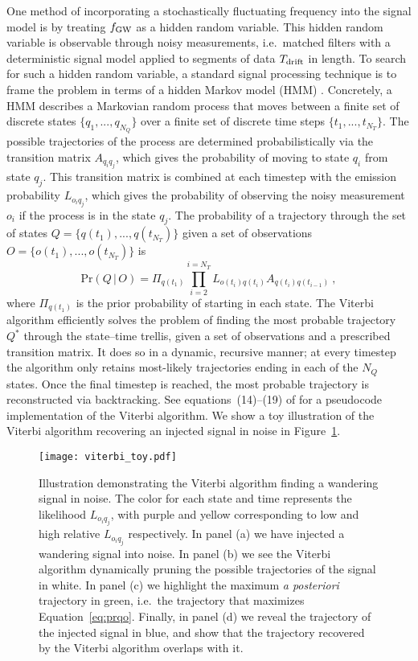 One method of incorporating a stochastically fluctuating frequency into the signal model is by treating $f_{\rm GW}$ as a hidden random variable. This hidden random variable is observable through noisy measurements, i.e.~matched filters with a deterministic signal model applied to segments of data $T_{\rm drift}$ in length. To search for such a hidden random variable, a standard signal processing technique is to frame the problem in terms of a hidden Markov model (HMM) \citep{Baum1966}. Concretely, a HMM describes a Markovian random process that moves between a finite set of discrete states $\{q_1,...,q_{N_Q}\}$ over a finite set of discrete time steps $\{t_1,...,t_{N_T}\}$. The possible trajectories of the process are determined probabilistically via the transition matrix $A_{q_i q_j}$, which gives the probability of moving to state $q_i$ from state $q_j$. This transition matrix is combined at each timestep with the emission probability $L_{o_i q_j}$, which gives the probability of observing the noisy measurement $o_i$ if the process is in the state $q_j$. The probability of a trajectory through the set of states $Q = \{q(t_1),...,q(t_{N_T})\}$ given a set of observations $O = \{o(t_1),...,o(t_{N_T})\}$ is
\begin{equation}
    \textrm{Pr}(Q\,|\,O) = \Pi_{q(t_1)} \prod_{i=2}^{i=N_T} L_{o(t_i)q(t_i)} A_{q(t_i)q(t_{i-1})}\ , \label{eq:prqo}
\end{equation}
where $\Pi_{q(t_1)}$ is the prior probability of starting in each state. The Viterbi algorithm \citep{Viterbi1967} efficiently solves the problem of finding the most probable trajectory $Q^*$ through the state--time trellis, given a set of observations and a prescribed transition matrix. It does so in a dynamic, recursive manner; at every timestep the algorithm only retains most-likely trajectories ending in each of the $N_Q$ states. Once the final timestep is reached, the most probable trajectory is reconstructed via backtracking. See equations~(14)--(19) of \citet{Suvorova2016} for a pseudocode implementation of the Viterbi algorithm. We show a toy illustration of the Viterbi algorithm recovering an injected signal in noise in Figure~\ref{fig:viterbi_ill}.
 
\begin{figure}
    \centering
    \texttt{[image: viterbi\_toy.pdf]}
    \caption{Illustration demonstrating the Viterbi algorithm finding a wandering signal in noise. The color for each state and time represents the likelihood $L_{o_i q_j}$, with purple and yellow corresponding to low and high relative $L_{o_i q_j}$ respectively. In panel (a) we have injected a wandering signal into noise. In panel (b) we see the Viterbi algorithm dynamically pruning the possible trajectories of the signal in white. In panel (c) we highlight the maximum \emph{a posteriori} trajectory in green, i.e.~the trajectory that maximizes Equation~\eqref{eq:prqo}. Finally, in panel (d) we reveal the trajectory of the injected signal in blue, and show that the trajectory recovered by the Viterbi algorithm overlaps with it.} \label{fig:viterbi_ill}
\end{figure}

